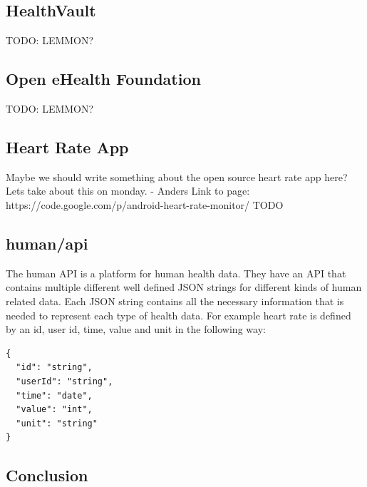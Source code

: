 \subsection{HealthVault}

TODO: LEMMON?

\subsection{Open eHealth Foundation}

TODO: LEMMON?

\subsection{Heart Rate App}

Maybe we should write something about the open source heart rate app here?
Lets take about this on monday. - Anders
Link to page: https://code.google.com/p/android-heart-rate-monitor/
TODO

\subsection{human/api \cite{HumanAPI}}

The human API is a platform for human health data. 
They have an API that contains multiple different well defined JSON strings for different kinds of human related data.
Each JSON string contains all the necessary information that is needed to represent each type of health data.
For example heart rate is defined by an id, user id, time, value and unit in the following way:

\begin{verbatim}
{
  "id": "string",
  "userId": "string",
  "time": "date",
  "value": "int",
  "unit": "string"
}
\end{verbatim}

\subsection{Conclusion}

